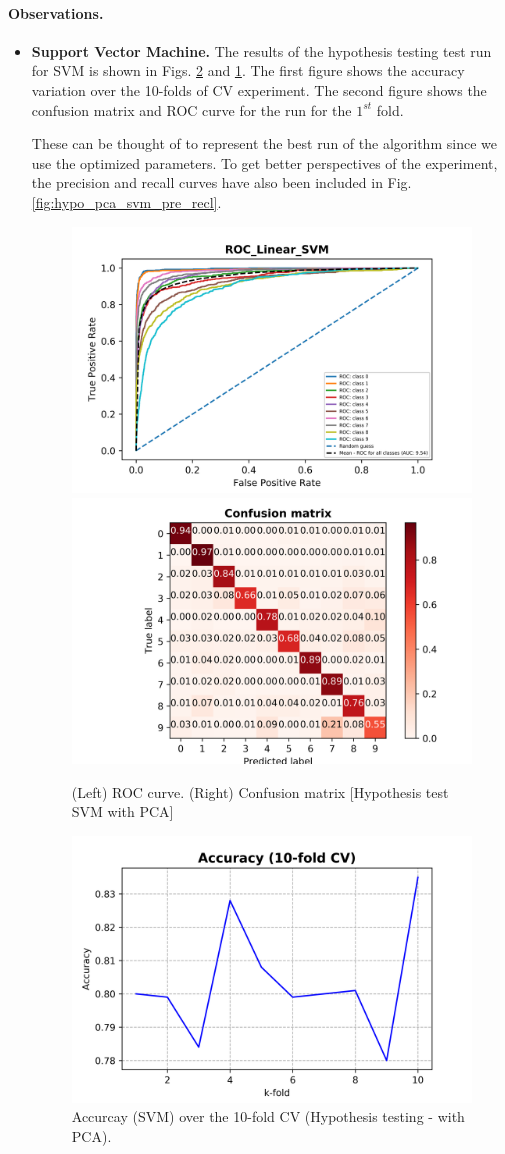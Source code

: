 \documentclass[10pt]{scrartcl}
\begin{document}
\paragraph{Observations.}
\begin{itemize}
\item{\textbf{Support Vector Machine.}} The results of the hypothesis testing test run for SVM is shown in Figs. \ref{fig:acc_svm_hypo_pca} and \ref{fig:hypo_pca_svm_roc_conf}. The first figure shows the accuracy variation over the 10-folds of CV experiment. The second figure shows the confusion matrix and ROC curve for the run for the $1^{st}$ fold. 

These can be thought of to represent the best run of the algorithm since we use the optimized parameters. To get better perspectives of the experiment, the precision and recall curves have also been included in Fig. \ref{fig:hypo_pca_svm_pre_recl}.

\begin{figure}[H]
\centering
\includegraphics[width=0.45\linewidth]{figures/SVM_linear_ROC_C_70_k_1_using_pca.png} 
\includegraphics[width=0.5\linewidth]{figures/SVM_Conf_matrix_C_70_k_1_using_pca.png}
\caption{(Left) ROC curve. (Right) Confusion matrix [Hypothesis test SVM with PCA] \label{fig:hypo_pca_svm_roc_conf}}
\end{figure}

\begin{figure}[H]
\centering
\includegraphics[width=0.5\linewidth]{figures/acc_svm_tuned_pca_hypo.png}
\caption{Accurcay (SVM) over the 10-fold CV (Hypothesis testing - with PCA). \label{fig:acc_svm_hypo_pca}}
\end{figure}


\end{itemize}
\end{document}
